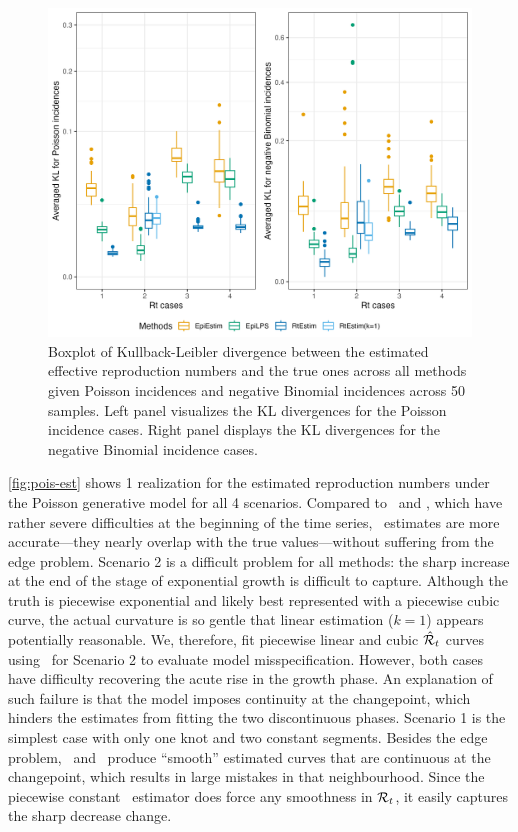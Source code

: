 \begin{figure}[htb]
    \centering
    \includegraphics[width=.9\textwidth]{fig/kl.png}
    \caption{Boxplot of Kullback-Leibler divergence between the estimated effective reproduction numbers and the true ones across all methods given Poisson incidences and negative Binomial incidences across 50 samples. Left panel visualizes the KL divergences for the Poisson incidence cases. Right panel displays the KL divergences for the negative Binomial incidence cases.}%
    \label{fig:kl-res}
\end{figure}



\autoref{fig:pois-est} shows 1 realization for the estimated reproduction
numbers under the Poisson generative model for all 4 scenarios. Compared to
\EpiEstim\ and \EpiLPS, which have rather severe difficulties at the beginning
of the time series, \RtEstim\ estimates are more accurate---they nearly overlap
with the true values---without suffering from the edge problem. Scenario 2 is a
difficult problem for all methods: the sharp increase at the end of the stage of
exponential growth is difficult to capture. Although the truth is piecewise
exponential and likely best represented with a piecewise cubic curve, the actual
curvature is so gentle that linear estimation ($k=1$) appears potentially
reasonable. We, therefore, fit piecewise linear and cubic $\hat{\mathcal{R}}_t$ curves
using \RtEstim\ for Scenario 2 to evaluate model misspecification. However, both
cases have difficulty recovering the acute rise in the growth phase. An
explanation of such failure is that the model imposes continuity at the
changepoint, which hinders the estimates from fitting the two discontinuous
phases. Scenario 1 is the simplest case with only one knot and two constant
segments. Besides the edge problem, \EpiEstim\ and \EpiLPS\ produce ``smooth''
estimated curves that are continuous at the changepoint, which results in
large mistakes in that neighbourhood. Since the
piecewise constant \RtEstim\ estimator does force any smoothness in
$\mathcal{R}_t$, it easily captures the sharp decrease change. 

